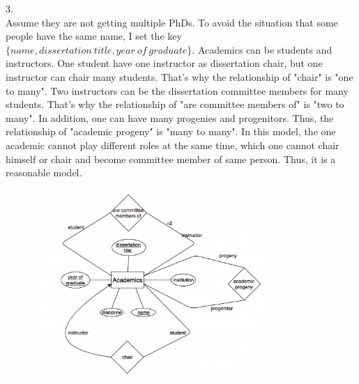 \documentclass[12pt]{article}
\begin{document}
3.\\
Assume they are not getting multiple PhDs. To avoid the situation that some people have the same name, I set the key $\{name, dissertation\ title, year\ of\ graduate\}$. Academics can be students and instructors. One student have one instructor as dissertation chair, but one instructor can chair many students. That's why the relationship of "chair" is "one to many". Two instructors can be the dissertation committee members for many students. That's why the relationship of "are committee members of" is "two to many". In addition, one can have many progenies and progenitors. Thus, the relationship of "academic progeny" is "many to many". In this model, the one academic cannot play different roles at the same time, which one cannot chair himself or chair and become committee member of same person. Thus, it is a reasonable model. \\
\begin{figure}[htbp]
   \centering
   \includegraphics[width=0.8\textwidth]{diagram.png} 
\end{figure}
\end{document}
